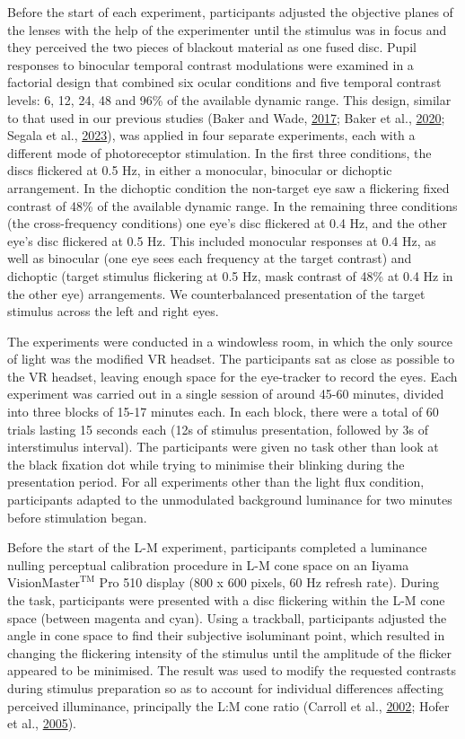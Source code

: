 \documentclass[
]{article}
\begin{document}
Before the start of each experiment, participants adjusted the objective planes of the lenses with the help of the experimenter until the stimulus was in focus and they perceived the two pieces of blackout material as one fused disc. Pupil responses to binocular temporal contrast modulations were examined in a factorial design that combined six ocular conditions and five temporal contrast levels: 6, 12, 24, 48 and 96\% of the available dynamic range. This design, similar to that used in our previous studies (Baker and Wade, \protect\hyperlink{ref-Baker2017}{2017}; Baker et al., \protect\hyperlink{ref-Baker2020}{2020}; Segala et al., \protect\hyperlink{ref-Segala2023}{2023}), was applied in four separate experiments, each with a different mode of photoreceptor stimulation. In the first three conditions, the discs flickered at 0.5 Hz, in either a monocular, binocular or dichoptic arrangement. In the dichoptic condition the non-target eye saw a flickering fixed contrast of 48\% of the available dynamic range. In the remaining three conditions (the cross-frequency conditions) one eye's disc flickered at 0.4 Hz, and the other eye's disc flickered at 0.5 Hz. This included monocular responses at 0.4 Hz, as well as binocular (one eye sees each frequency at the target contrast) and dichoptic (target stimulus flickering at 0.5 Hz, mask contrast of 48\% at 0.4 Hz in the other eye) arrangements. We counterbalanced presentation of the target stimulus across the left and right eyes.

The experiments were conducted in a windowless room, in which the only source of light was the modified VR headset. The participants sat as close as possible to the VR headset, leaving enough space for the eye-tracker to record the eyes. Each experiment was carried out in a single session of around 45-60 minutes, divided into three blocks of 15-17 minutes each. In each block, there were a total of 60 trials lasting 15 seconds each (12s of stimulus presentation, followed by 3s of interstimulus interval). The participants were given no task other than look at the black fixation dot while trying to minimise their blinking during the presentation period. For all experiments other than the light flux condition, participants adapted to the unmodulated background luminance for two minutes before stimulation began.

Before the start of the L-M experiment, participants completed a luminance nulling perceptual calibration procedure in L-M cone space on an Iiyama \(\textrm{VisionMaster}^{\textrm{TM}}\) Pro 510 display (800 x 600 pixels, 60 Hz refresh rate). During the task, participants were presented with a disc flickering within the L-M cone space (between magenta and cyan). Using a trackball, participants adjusted the angle in cone space to find their subjective isoluminant point, which resulted in changing the flickering intensity of the stimulus until the amplitude of the flicker appeared to be minimised. The result was used to modify the requested contrasts during stimulus preparation so as to account for individual differences affecting perceived illuminance, principally the L:M cone ratio (Carroll et al., \protect\hyperlink{ref-Carroll2002}{2002}; Hofer et al., \protect\hyperlink{ref-Hofer2005}{2005}).
\end{document}
